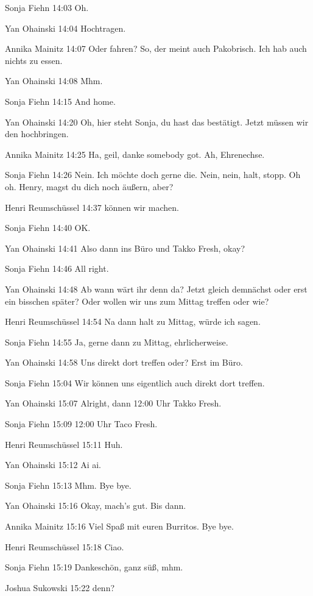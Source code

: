 Sonja Fiehn   14:03
Oh.

Yan Ohainski   14:04
Hochtragen.

Annika Mainitz   14:07
Oder fahren? So, der meint auch Pakobrisch. Ich hab auch nichts zu essen.

Yan Ohainski   14:08
Mhm.

Sonja Fiehn   14:15
And home.

Yan Ohainski   14:20
Oh, hier steht Sonja, du hast das bestätigt.
Jetzt müssen wir den hochbringen.

Annika Mainitz   14:25
Ha, geil, danke somebody got. Ah, Ehrenechse.

Sonja Fiehn   14:26
Nein.
Ich möchte doch gerne die. Nein, nein, halt, stopp.
Oh oh.
Henry, magst du dich noch äußern, aber?

Henri Reumschüssel   14:37
können wir machen.

Sonja Fiehn   14:40
OK.

Yan Ohainski   14:41
Also dann ins Büro und Takko Fresh, okay?

Sonja Fiehn   14:46
All right.

Yan Ohainski   14:48
Ab wann wärt ihr denn da?
Jetzt gleich demnächst oder erst ein bisschen später? Oder wollen wir uns zum Mittag treffen oder wie?

Henri Reumschüssel   14:54
Na dann halt zu Mittag, würde ich sagen.

Sonja Fiehn   14:55
Ja, gerne dann zu Mittag, ehrlicherweise.

Yan Ohainski   14:58
Uns direkt dort treffen oder?
Erst im Büro.

Sonja Fiehn   15:04
Wir können uns eigentlich auch direkt dort treffen.

Yan Ohainski   15:07
Alright, dann 12:00 Uhr Takko Fresh.

Sonja Fiehn   15:09
12:00 Uhr Taco Fresh.

Henri Reumschüssel   15:11
Huh.

Yan Ohainski   15:12
Ai ai.

Sonja Fiehn   15:13
Mhm.
Bye bye.

Yan Ohainski   15:16
Okay, mach's gut. Bis dann.

Annika Mainitz   15:16
Viel Spaß mit euren Burritos. Bye bye.

Henri Reumschüssel   15:18
Ciao.

Sonja Fiehn   15:19
Dankeschön, ganz süß, mhm.

Joshua Sukowski   15:22
denn?

